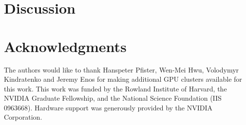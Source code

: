 \documentclass[preprint, 12pt]{elsarticle}
\begin{document}


\section{Discussion}



\section{Acknowledgments}
The authors would like to thank Hanspeter Pfister, Wen-Mei Hwu, Volodymyr
Kindratenko and Jeremy Enos for making additional GPU clusters available for
this work. This work was funded by the Rowland Institute of Harvard, the NVIDIA
Graduate Fellowship, and the National Science Foundation (IIS 0963668).
Hardware support was generously provided by the NVIDIA Corporation.




\end{document}
